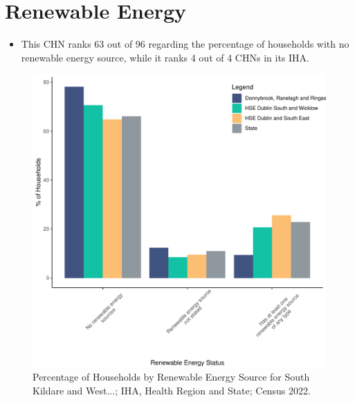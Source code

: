 \documentclass{article}
\begin{document}
\section{Renewable Energy}\label{sect:RE}
\begin{itemize}
\item This CHN ranks  63 out of 96 regarding the percentage of households with no renewable energy source, while it ranks   4 out of 4 CHNs in its IHA.
\end{itemize}
\begin{figure}[H]
	\centering
	\includegraphics[width = 140mm]{../figures/RenewableEnergyED.pdf}
	\caption{Percentage of Households by Renewable Energy Source for South Kildare and West...; IHA, Health Region and State; Census 2022.}
	\label{fig:vbnv}
	\end{figure}
\end{document}
